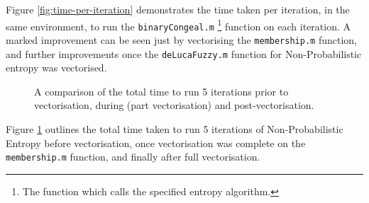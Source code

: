 Figure \ref{fig:time-per-iteration} demonstrates the time taken per iteration, in the same environment, to run the \texttt{binaryCongeal.m} \footnote{The function which calls the specified entropy algorithm.} function on each iteration. A marked improvement can be seen just by vectorising the \texttt{membership.m} function, and further improvements once the \texttt{deLucaFuzzy.m} function for Non-Probabilistic entropy was vectorised.

\begin{figure}[H]
  \begin{center}
    \caption{A comparison of the total time to run 5 iterations prior to vectorisation, during (part vectorisation) and post-vectorisation.}
    \label{fig:total-time}
  \end{center}
\end{figure}

Figure \ref{fig:total-time} outlines the total time taken to run 5 iterations of Non-Probabilistic Entropy before vectorisation, once vectorisation was complete on the \texttt{membership.m} function, and finally after full vectorisation.
